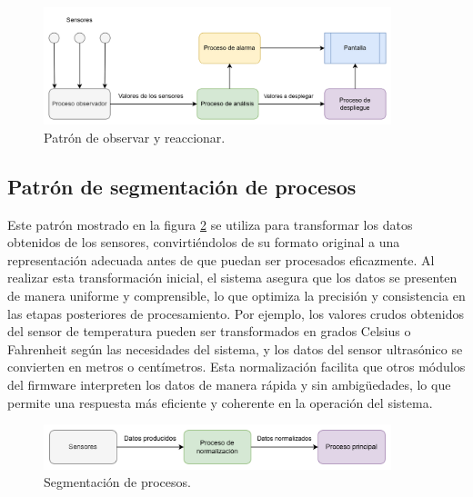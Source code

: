 \vspace{1cm}
\begin{figure}[htbp]
	\centering
	\includegraphics[width=0.9\textwidth, height=0.25\textheight]{./Figures/patron_de_observar_y_reaccionar.png}
	\caption{Patrón de observar y reaccionar.}
	\label{fig:patron_de_observar_y_reaccionar}
\end{figure}
\vspace{1cm}

\newpage

\subsection{Patrón de segmentación de procesos}

Este patrón mostrado en la figura \ref{fig:segmentacion_de_procesos} se utiliza para transformar los datos obtenidos de los sensores, convirtiéndolos de su formato original a una representación adecuada antes de que puedan ser procesados eficazmente. Al realizar esta transformación inicial, el sistema asegura que los datos se presenten de manera uniforme y comprensible, lo que optimiza la precisión y consistencia en las etapas posteriores de procesamiento. Por ejemplo, los valores crudos obtenidos del sensor de temperatura pueden ser transformados en grados Celsius o Fahrenheit según las necesidades del sistema, y los datos del sensor ultrasónico se convierten en metros o centímetros. Esta normalización facilita que otros módulos del firmware interpreten los datos de manera rápida y sin ambigüedades, lo que permite una respuesta más eficiente y coherente en la operación del sistema.

\vspace{1cm}
\begin{figure}[htbp]
	\centering
	\includegraphics[width=0.9\textwidth, height=0.1\textheight]{./Figures/segmentacion_de_procesos.png}
	\caption{Segmentación de procesos.}
	\label{fig:segmentacion_de_procesos}
\end{figure}
\vspace{1cm}

